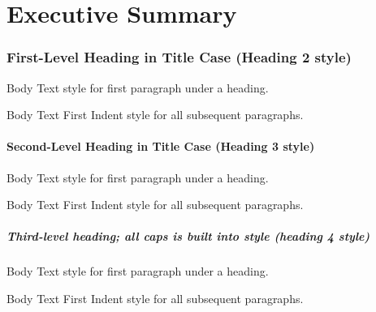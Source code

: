 \part{Executive Summary}


\section{First-Level Heading in Title Case (Heading 2 style)}

Body Text style for first paragraph under a heading.

Body Text First Indent style for all subsequent paragraphs. 

\subsection{Second-Level Heading in Title Case (Heading 3 style)}

Body Text style for first paragraph under a heading.

Body Text First Indent style for all subsequent paragraphs.


\subsubsection{Third-level heading; all caps is built into style (heading 4 style)}

Body Text style for first paragraph under a heading.

Body Text First Indent style for all subsequent paragraphs.